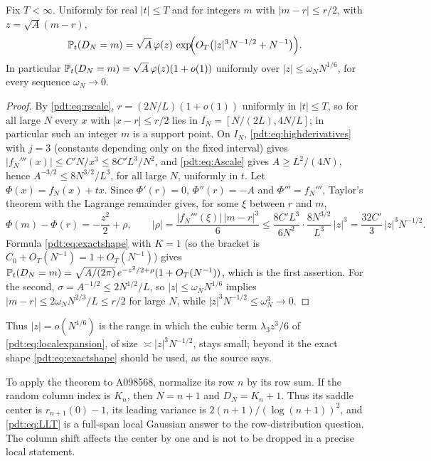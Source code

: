 \begin{proposition}\label{pdt:prop:moderate}
Fix $T<\infty$. Uniformly for real $|t|\le T$ and for integers $m$ with
$|m-r|\le r/2$, with $z=\sqrt A(m-r)$,
\[
 \mathbb P_t(D_N=m)=\sqrt A\,\varphi(z)\,
 \exp\!\Bigl(O_T\bigl(|z|^3N^{-1/2}+N^{-1}\bigr)\Bigr).
\]
In particular $\mathbb P_t(D_N=m)=\sqrt A\,\varphi(z)(1+o(1))$ uniformly over
$|z|\le\omega_NN^{1/6}$, for every sequence $\omega_N\to0$.
\end{proposition}
\begin{proof}
By \eqref{pdt:eq:rscale}, $r=(2N/L)(1+o(1))$ uniformly in $|t|\le T$, so
for all large $N$ every $x$ with $|x-r|\le r/2$ lies in
$I_N=[N/(2L),4N/L]$; in particular such an integer $m$ is a support point.
On $I_N$, \eqref{pdt:eq:highderivatives} with $j=3$ (constants depending
only on the fixed interval) gives $|f_N'''(x)|\le C'N/x^3\le8C'L^3/N^2$,
and \eqref{pdt:eq:Ascale} gives $A\ge L^2/(4N)$, hence
$A^{-3/2}\le8N^{3/2}/L^3$, for all large $N$, uniformly in $t$. Let
$\Phi(x)=f_N(x)+tx$. Since $\Phi'(r)=0$, $\Phi''(r)=-A$ and
$\Phi'''=f_N'''$, Taylor's theorem with the Lagrange remainder gives, for
some $\xi$ between $r$ and $m$,
\[
 \Phi(m)-\Phi(r)=-\frac{z^2}2+\rho,\qquad
 |\rho|=\frac{|f_N'''(\xi)|\,|m-r|^3}6
 \le\frac{8C'L^3}{6N^2}\cdot\frac{8N^{3/2}}{L^3}\,|z|^3
 =\frac{32C'}3\,|z|^3N^{-1/2}.
\]
Formula \eqref{pdt:eq:exactshape} with $K=1$ (so the bracket is
$C_0+O_T(N^{-1})=1+O_T(N^{-1})$) gives
$\mathbb P_t(D_N=m)=\sqrt{A/(2\pi)}\,e^{-z^2/2+\rho}(1+O_T(N^{-1}))$, which is
the first assertion. For the second, $\sigma=A^{-1/2}\le2N^{1/2}/L$, so
$|z|\le\omega_NN^{1/6}$ implies $|m-r|\le2\omega_NN^{2/3}/L\le r/2$ for
large $N$, while $|z|^3N^{-1/2}\le\omega_N^3\to0$.
\end{proof}
Thus $|z|=o(N^{1/6})$ is the range in which the cubic term
$\lambda_3z^3/6$ of \eqref{pdt:eq:localexpansion}, of size
$\asymp|z|^3N^{-1/2}$, stays small; beyond it the exact shape
\eqref{pdt:eq:exactshape} should be used, as the source says.

To apply the theorem to A098568, normalize its row $n$ by its row sum. If the random column index is $K_n$, then $N=n+1$ and $D_N=K_n+1$. Thus its saddle center is $r_{n+1}(0)-1$, its leading variance is $2(n+1)/(\log(n+1))^2$, and \eqref{pdt:eq:LLT} is a full-span local Gaussian answer to the row-distribution question. The column shift affects the center by one and is not to be dropped in a precise local statement.

